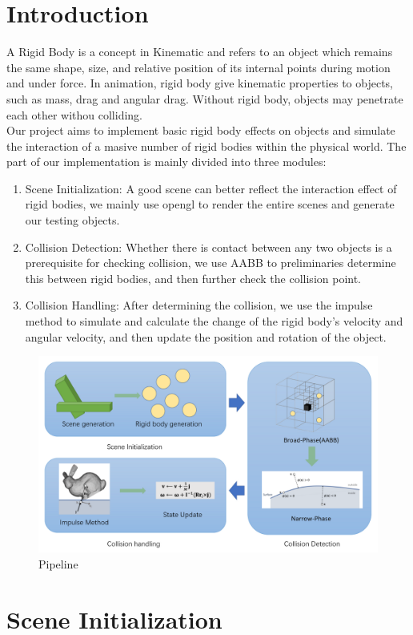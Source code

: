 \documentclass[acmtog]{acmart}
\begin{document}
\section{Introduction}
A Rigid Body is a concept in Kinematic and refers to an object which remains the same shape, size, and relative position of its internal points during motion and under force. In animation, rigid body give kinematic properties to objects, such as mass, drag and angular drag. Without rigid body, objects may penetrate each other withou colliding.\\
Our project aims to implement basic rigid body effects on objects and simulate the interaction of a masive number of rigid bodies within the physical world. The part of our implementation is mainly divided into three modules:
\begin{enumerate}
	\item Scene Initialization: A good scene can better reflect the interaction effect of rigid bodies, we mainly use opengl to render the entire scenes and generate our testing objects.
	\item Collision Detection: Whether there is contact between any two objects is a prerequisite for checking collision, we use AABB to preliminaries determine this between rigid bodies, and then further check the collision point.
	\item Collision Handling: After determining the collision, we use the impulse method to simulate and calculate the change of the rigid body's velocity and angular velocity, and then update the position and rotation of the object.
\end{enumerate}
\begin{figure}[htb]
	\includegraphics[width=\linewidth]{Introduction.png}
	\caption{Pipeline}
\end{figure}
\section{Scene Initialization}
\end{document}
